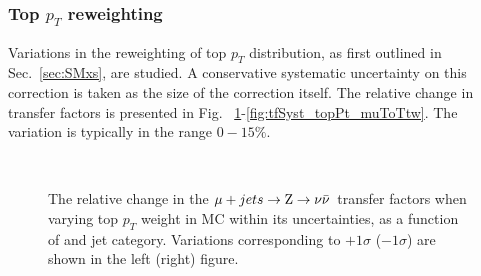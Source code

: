 \subsubsection*{Top $p_T$ reweighting}
\label{sec:tfSyst_topPt}

Variations in the reweighting of top $p_{T}$ distribution, as first outlined in 
Sec.~\ref{sec:SMxs}, are studied. A conservative systematic
uncertainty on this correction is taken as the size of the correction itself. 
The relative change in transfer factors is presented in Fig.
~\ref{fig:tfSyst_topPt_muToZinv}-\ref{fig:tfSyst_topPt_muToTtw}. The
variation is typically in the range $0-15\%$.

\begin{figure}[]
  \centering
   ~~
  \\

  \caption{\label{fig:tfSyst_topPt_muToZinv} The relative change in the $\mj \rightarrow \znunu$ transfer
  factors when varying top $p_{T}$ weight in MC within its uncertainties, as a function of \scalht and jet category. 
  Variations corresponding to $+1\sigma$ ($-1\sigma$) are shown in the left (right) figure. 
  }
\end{figure}

